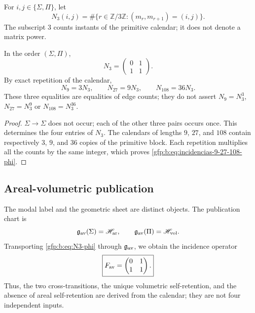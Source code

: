 \begin{definition}
For \(i,j\in\{\Sigma,\Pi\}\), let
\[
 N_3(i,j)=
 \#\{r\in\mathbb Z/3\mathbb Z:(m_r,m_{r+1})=(i,j)\}.
\]
The subscript \(3\) counts instants of the primitive calendar; it does not denote a
matrix power.
\end{definition}

\begin{theorem}
\label{gfp:b:thm:descenso-incidencia-modal-phi}
In the order \((\Sigma,\Pi)\),
\begin{equation}
 \boxed{
 N_3=
 \begin{pmatrix}
 0&1\\
 1&1
 \end{pmatrix}.}
 \label{gfp:b:eq:N3-phi}
\end{equation}
By exact repetition of the calendar,
\begin{equation}
 \boxed{
 N_9=3N_3,
 \qquad
 N_{27}=9N_3,
 \qquad
 N_{108}=36N_3.}
 \label{gfp:b:eq:incidencias-9-27-108-phi}
\end{equation}
These three equalities are equalities of edge counts; they do not assert
\(N_9=N_3^3\), \(N_{27}=N_3^9\) or \(N_{108}=N_3^{36}\).
\end{theorem}

\begin{proof}
\(\Sigma\to\Sigma\) does not occur; each of the other three pairs occurs
once. This determines the four entries of \(N_3\). The calendars of
lengths \(9\), \(27\), and \(108\) contain respectively \(3\), \(9\),
and \(36\) copies of the primitive block. Each repetition multiplies all the
counts by the same integer, which proves
\eqref{gfp:b:eq:incidencias-9-27-108-phi}.
\end{proof}

\subsection{Areal-volumetric publication}

The modal label and the geometric sheet are distinct objects. The publication chart is
\[
 \mathfrak g_{\rm av}(\Sigma)=\mathscr H_{\rm ar},
 \qquad
 \mathfrak g_{\rm av}(\Pi)=\mathscr H_{\rm vol}.
\]
Transporting \eqref{gfp:b:eq:N3-phi} through \(\mathfrak g_{\rm av}\), we obtain
the incidence operator
\begin{equation}
 \boxed{
 F_{\rm av}=
 \begin{pmatrix}
 0&1\\
 1&1
 \end{pmatrix}.}
 \label{gfp:b:eq:Fav-derivada-phi}
\end{equation}
Thus, the two cross-transitions, the unique volumetric self-retention, and the
absence of areal self-retention are derived from the calendar; they are not four
independent inputs.

